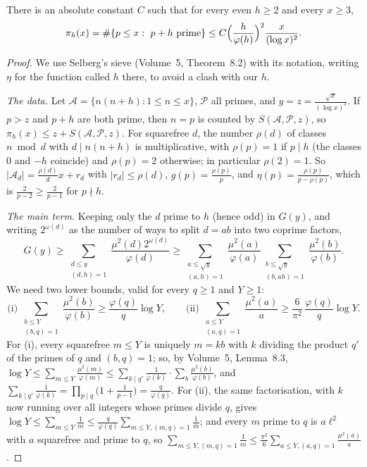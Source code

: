 \begin{proposition}\label{conjectures:prop:pairs}
There is an absolute constant $C$ such that for every even $h\ge2$ and every $x\ge3$,
\[
\pi_h(x)=\#\{p\le x:\ p+h\text{ prime}\}\le C\Bigl(\frac h{\varphi(h)}\Bigr)^2\frac x{(\log x)^2}.
\]
\end{proposition}
\begin{proof}
We use Selberg's sieve (Volume~5, Theorem~8.2) with its notation, writing $\eta$ for the function called $h$ there, to avoid a clash with our $h$.

\emph{The data.} Let $\mathcal A=\{n(n+h):1\le n\le x\}$, $\mathcal P$ all primes, and $y=z=\frac{\sqrt x}{(\log x)^3}$. If $p>z$ and $p+h$ are both prime, then
$n=p$ is counted by $S(\mathcal A,\mathcal P,z)$, so $\pi_h(x)\le z+S(\mathcal A,\mathcal P,z)$. For squarefree $d$, the number $\rho(d)$ of classes $n\bmod d$ with
$d\mid n(n+h)$ is multiplicative, with $\rho(p)=1$ if $p\mid h$ (the classes $0$ and $-h$ coincide) and $\rho(p)=2$ otherwise; in particular $\rho(2)=1$. So
$|\mathcal A_d|=\frac{\rho(d)}dx+r_d$ with $|r_d|\le\rho(d)$, $g(p)=\frac{\rho(p)}p$, and $\eta(p)=\frac{\rho(p)}{p-\rho(p)}$, which is $\frac2{p-2}\ge\frac2{p-1}$ for
$p\nmid h$.

\emph{The main term.} Keeping only the $d$ prime to $h$ (hence odd) in $G(y)$, and writing $2^{\omega(d)}$ as the number of ways to split $d=ab$ into
two coprime factors,
\[
G(y)\ge\sum_{\substack{d\le y\\(d,h)=1}}\frac{\mu^2(d)2^{\omega(d)}}{\varphi(d)}\ge\sum_{\substack{a\le\sqrt y\\(a,h)=1}}\frac{\mu^2(a)}{\varphi(a)}\sum_{\substack{b\le\sqrt y\\(b,ah)=1}}\frac{\mu^2(b)}{\varphi(b)}.
\]
We need two lower bounds, valid for every $q\ge1$ and $Y\ge1$:
\[
\text{(i)}\ \sum_{\substack{b\le Y\\(b,q)=1}}\frac{\mu^2(b)}{\varphi(b)}\ge\frac{\varphi(q)}q\log Y,\qquad\text{(ii)}\ \sum_{\substack{a\le Y\\(a,q)=1}}\frac{\mu^2(a)}a\ge\frac6{\pi^2}\,\frac{\varphi(q)}q\log Y.
\]
For (i), every squarefree $m\le Y$ is uniquely $m=kb$ with $k$ dividing the product $q'$ of the primes of $q$ and $(b,q)=1$; so, by Volume~5, Lemma~8.3,
$\log Y\le\sum_{m\le Y}\frac{\mu^2(m)}{\varphi(m)}\le\sum_{k\mid q'}\frac1{\varphi(k)}\cdot\sum_{b}\frac{\mu^2(b)}{\varphi(b)}$, and
$\sum_{k\mid q'}\frac1{\varphi(k)}=\prod_{p\mid q}\bigl(1+\frac1{p-1}\bigr)=\frac q{\varphi(q)}$. For (ii), the same factorisation, with $k$ now running over all
integers whose primes divide $q$, gives $\log Y\le\sum_{m\le Y}\frac1m\le\frac q{\varphi(q)}\sum_{m\le Y,(m,q)=1}\frac1m$; and every $m$ prime to $q$ is $a\ell^2$ with $a$
squarefree and prime to $q$, so $\sum_{m\le Y,(m,q)=1}\frac1m\le\frac{\pi^2}6\sum_{a\le Y,(a,q)=1}\frac{\mu^2(a)}a$.


\end{proof}
